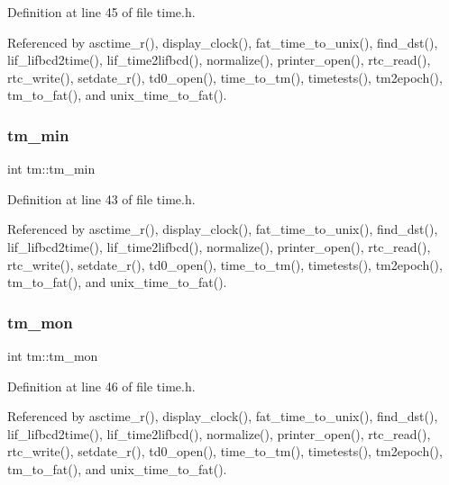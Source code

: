 Definition at line 45 of file time.\+h.



Referenced by asctime\+\_\+r(), display\+\_\+clock(), fat\+\_\+time\+\_\+to\+\_\+unix(), find\+\_\+dst(), lif\+\_\+lifbcd2time(), lif\+\_\+time2lifbcd(), normalize(), printer\+\_\+open(), rtc\+\_\+read(), rtc\+\_\+write(), setdate\+\_\+r(), td0\+\_\+open(), time\+\_\+to\+\_\+tm(), timetests(), tm2epoch(), tm\+\_\+to\+\_\+fat(), and unix\+\_\+time\+\_\+to\+\_\+fat().

\mbox{\label{structtm_af414eb7c86cc3099595211eee4d4211b}} 
\subsubsection{\texorpdfstring{tm\+\_\+min}{tm\_min}}
{\footnotesize\ttfamily int tm\+::tm\+\_\+min}



Definition at line 43 of file time.\+h.



Referenced by asctime\+\_\+r(), display\+\_\+clock(), fat\+\_\+time\+\_\+to\+\_\+unix(), find\+\_\+dst(), lif\+\_\+lifbcd2time(), lif\+\_\+time2lifbcd(), normalize(), printer\+\_\+open(), rtc\+\_\+read(), rtc\+\_\+write(), setdate\+\_\+r(), td0\+\_\+open(), time\+\_\+to\+\_\+tm(), timetests(), tm2epoch(), tm\+\_\+to\+\_\+fat(), and unix\+\_\+time\+\_\+to\+\_\+fat().

\mbox{\label{structtm_a112ac36fa2f593777138a417cf031e17}} 
\subsubsection{\texorpdfstring{tm\+\_\+mon}{tm\_mon}}
{\footnotesize\ttfamily int tm\+::tm\+\_\+mon}



Definition at line 46 of file time.\+h.



Referenced by asctime\+\_\+r(), display\+\_\+clock(), fat\+\_\+time\+\_\+to\+\_\+unix(), find\+\_\+dst(), lif\+\_\+lifbcd2time(), lif\+\_\+time2lifbcd(), normalize(), printer\+\_\+open(), rtc\+\_\+read(), rtc\+\_\+write(), setdate\+\_\+r(), td0\+\_\+open(), time\+\_\+to\+\_\+tm(), timetests(), tm2epoch(), tm\+\_\+to\+\_\+fat(), and unix\+\_\+time\+\_\+to\+\_\+fat().

